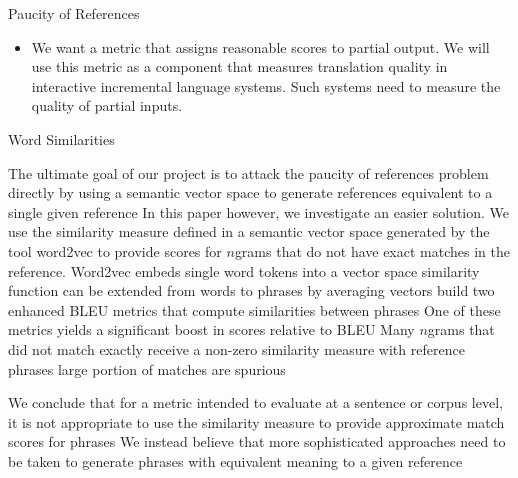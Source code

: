 \begin{block}{Paucity of References}
\begin{description}
\begin{itemize}
\item 
We want a metric that assigns reasonable scores to partial output. 
We  will use this metric as a component that measures translation quality in interactive incremental language systems. 
Such systems need to measure the quality of partial inputs. 
\end{itemize}

Word Similarities

The ultimate goal of our project is to attack the paucity of references problem directly by using a semantic vector space to generate references equivalent to a single given reference
In this paper however, we investigate an easier solution. 
We use the similarity measure defined in a semantic vector space generated by the tool word2vec to provide scores for $n$grams that do not have exact matches in the reference. 
Word2vec embeds single word tokens into a vector space
similarity function can be extended from words to phrases by averaging vectors
build two enhanced BLEU metrics that compute similarities between phrases 
One of these metrics yields a significant boost in scores relative to BLEU 
Many $n$grams that did not match exactly receive a non-zero similarity measure with reference phrases 
large portion of matches are spurious 

We conclude that for a metric intended to evaluate at a sentence or corpus level, it is not appropriate to use the similarity measure to provide approximate match scores for phrases 
We instead believe that more sophisticated approaches need to be taken to generate phrases with equivalent meaning to a given reference
\end{description}
\end{block}


